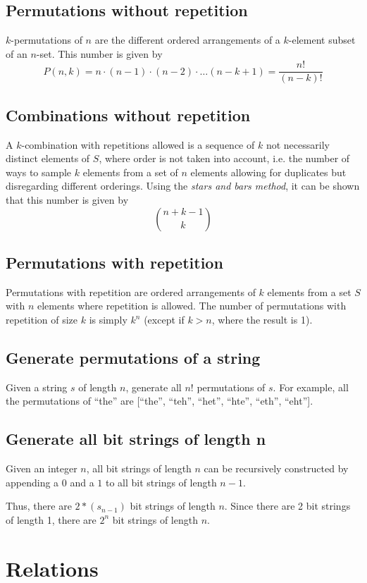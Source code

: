 \documentclass{article}
\begin{document}
\subsection{Permutations without repetition}
$k$-permutations of $n$ are the different ordered arrangements of a $k$-element subset of an $n$-set. This number is given by
\[P(n,k) = n \cdot (n-1) \cdot (n-2) \cdot \dots (n-k+1) = \frac{n!}{(n-k)!}\]
\subsection{Combinations without repetition}
A $k$-combination with repetitions allowed is a sequence of $k$ not necessarily distinct elements of $S$, where order is not taken into account, i.e. the number of ways to sample $k$ elements from a set of $n$ elements allowing for duplicates but disregarding different orderings. Using the \emph{stars and bars method}, it can be shown that this number is given by
\[{n+k-1 \choose k}\]

\subsection{Permutations with repetition}
Permutations with repetition are ordered arrangements of $k$ elements from a set $S$ with $n$ elements where repetition is allowed. The number of permutations with repetition of size $k$ is simply $k^n$ (except if $k > n$, where the result is 1).
\subsection{Generate permutations of a string}
Given a string $s$ of length $n$, generate all $n!$ permutations of $s$. For example, all the permutations of ``the'' are [``the'', ``teh'', ``het'', ``hte'', ``eth'', ``eht''].
\subsection{Generate all bit strings of length n}
Given an integer $n$, all bit strings of length $n$ can be recursively constructed by appending a $0$ and a $1$ to all bit strings of length $n-1$.

\noindent Thus, there are $2*(s_{n-1})$ bit strings of length $n$. Since there are 2 bit strings of length 1, there are $2^n$ bit strings of length $n$. 

\section{Relations}
\end{document}
